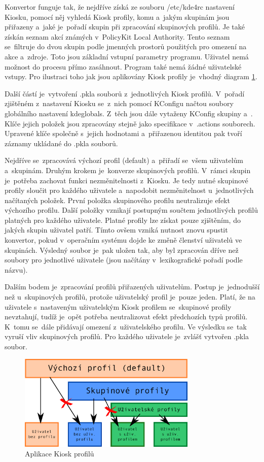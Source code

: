Konvertor funguje tak, že nejdříve získá ze souboru /etc/kde4rc nastavení Kiosku, pomocí něj vyhledá Kiosk profily, komu a~jakým skupinám jsou přiřazeny a~jaké je~pořadí skupin při zpracování skupinových profilů. Je také získán seznam akcí známých v~PolicyKit Local Authority. Tento seznam se~filtruje do dvou skupin podle jmenných prostorů použitých pro omezení na akce a~zdroje. Toto jsou základní vstupní parametry programu. Uživatel nemá možnost do procesu přímo zasáhnout. Program také nemá žádné uživatelské vstupy. Pro ilustraci toho jak jsou aplikovány Kiosk profily je~vhodný diagram \ref{fig:konv_profily}.

Další částí je~vytvoření .pkla souborů z~jednotlivých Kiosk profilů. V~pořadí zjištěném z~nastavení Kiosku se~z~nich pomocí KConfigu načtou soubory globálního nastavení kdeglobals. Z~těch jsou dále vytaženy KConfig skupiny  a~. Klíče jejich položek jsou zpracovány stejně jako specifikace v~.actions souborech. Upravené klíče společně s~jejich hodnotami a~přiřazenou identitou pak tvoří záznamy ukládané do .pkla souborů.

Nejdříve se~zpracovává výchozí profil (default) a~přiřadí se~všem uživatelům a~skupinám. Druhým krokem je~konverze skupinových profilů. V~rámci skupin je~potřeba zachovat funkci nezměnitelnosti z~Kiosku. Je tedy nutné skupinové profily sloučit pro každého uživatele a~napodobit nezměnitelnost u~jednotlivých načítaných položek. První položka skupinového profilu neutralizuje efekt výchozího profilu. Další položky vznikají postupným součtem jednotlivých profilů platných pro každého uživatele. Platné profily lze získat pouze zjištěním, do jakých skupin uživatel patří. Tímto ovšem vzniká nutnost znovu spustit konvertor, pokud v~operačním systému dojde ke změně členství uživatelů ve skupinách. Výsledný soubor je~pak uložen tak, aby byl zpracován dříve než soubory pro jednotlivé uživatele (jsou načítány v~lexikografické pořadí podle názvu).

Dalším bodem je~zpracování profilů přiřazených uživatelům. Postup je~jednodušší než u~skupinových profilů, protože uživatelský profil je~pouze jeden. Platí, že na uživatele s~nastaveným uživatelským Kiosk profilem se~skupinové profily nevztahují, tudíž je~opět potřeba neutralizovat efekt předchozích typů profilů. K~tomu se~dále přidávají omezení z~uživatelského profilu. Ve výsledku se~tak vyruší vliv skupinových profilů. Pro každého uživatele je~zvlášť vytvořen .pkla soubor.

\begin{figure}[h]
    \centering
    \includegraphics[width=8.5cm]{obrazky/profily.pdf}
    \caption{Aplikace Kiosk profilů}
    \label{fig:konv_profily}
\end{figure}

